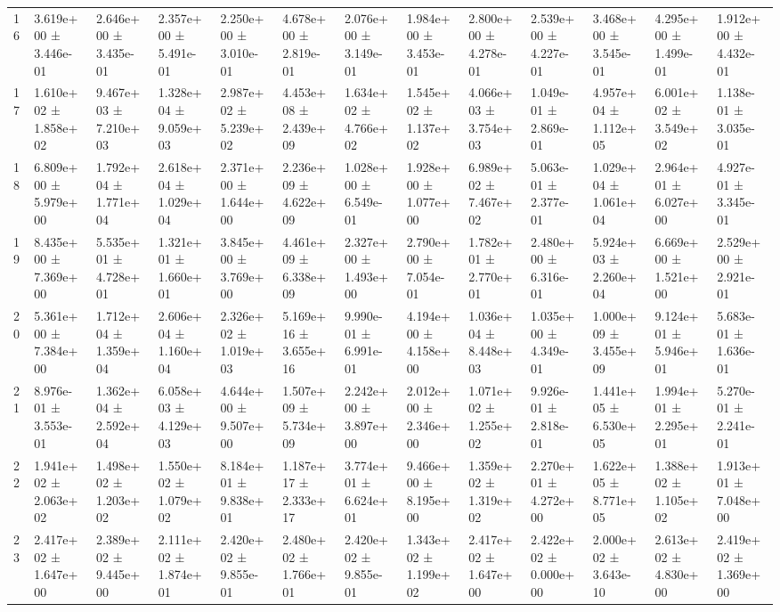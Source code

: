 \begin{table}
\begin{tabular}{lllllllllllll}
16 & 3.619e+00 ± 3.446e-01 & 2.646e+00 ± 3.435e-01 & 2.357e+00 ± 5.491e-01 & 2.250e+00 ± 3.010e-01 & 4.678e+00 ± 2.819e-01 & 2.076e+00 ± 3.149e-01 & 1.984e+00 ± 3.453e-01 & 2.800e+00 ± 4.278e-01 & 2.539e+00 ± 4.227e-01 & 3.468e+00 ± 3.545e-01 & 4.295e+00 ± 1.499e-01 & 1.912e+00 ± 4.432e-01 \\
17 & 1.610e+02 ± 1.858e+02 & 9.467e+03 ± 7.210e+03 & 1.328e+04 ± 9.059e+03 & 2.987e+02 ± 5.239e+02 & 4.453e+08 ± 2.439e+09 & 1.634e+02 ± 4.766e+02 & 1.545e+02 ± 1.137e+02 & 4.066e+03 ± 3.754e+03 & 1.049e-01 ± 2.869e-01 & 4.957e+04 ± 1.112e+05 & 6.001e+02 ± 3.549e+02 & 1.138e-01 ± 3.035e-01 \\
18 & 6.809e+00 ± 5.979e+00 & 1.792e+04 ± 1.771e+04 & 2.618e+04 ± 1.029e+04 & 2.371e+00 ± 1.644e+00 & 2.236e+09 ± 4.622e+09 & 1.028e+00 ± 6.549e-01 & 1.928e+00 ± 1.077e+00 & 6.989e+02 ± 7.467e+02 & 5.063e-01 ± 2.377e-01 & 1.029e+04 ± 1.061e+04 & 2.964e+01 ± 6.027e+00 & 4.927e-01 ± 3.345e-01 \\
19 & 8.435e+00 ± 7.369e+00 & 5.535e+01 ± 4.728e+01 & 1.321e+01 ± 1.660e+01 & 3.845e+00 ± 3.769e+00 & 4.461e+09 ± 6.338e+09 & 2.327e+00 ± 1.493e+00 & 2.790e+00 ± 7.054e-01 & 1.782e+01 ± 2.770e+01 & 2.480e+00 ± 6.316e-01 & 5.924e+03 ± 2.260e+04 & 6.669e+00 ± 1.521e+00 & 2.529e+00 ± 2.921e-01 \\
20 & 5.361e+00 ± 7.384e+00 & 1.712e+04 ± 1.359e+04 & 2.606e+04 ± 1.160e+04 & 2.326e+02 ± 1.019e+03 & 5.169e+16 ± 3.655e+16 & 9.990e-01 ± 6.991e-01 & 4.194e+00 ± 4.158e+00 & 1.036e+04 ± 8.448e+03 & 1.035e+00 ± 4.349e-01 & 1.000e+09 ± 3.455e+09 & 9.124e+01 ± 5.946e+01 & 5.683e-01 ± 1.636e-01 \\
21 & 8.976e-01 ± 3.553e-01 & 1.362e+04 ± 2.592e+04 & 6.058e+03 ± 4.129e+03 & 4.644e+00 ± 9.507e+00 & 1.507e+09 ± 5.734e+09 & 2.242e+00 ± 3.897e+00 & 2.012e+00 ± 2.346e+00 & 1.071e+02 ± 1.255e+02 & 9.926e-01 ± 2.818e-01 & 1.441e+05 ± 6.530e+05 & 1.994e+01 ± 2.295e+01 & 5.270e-01 ± 2.241e-01 \\
22 & 1.941e+02 ± 2.063e+02 & 1.498e+02 ± 1.203e+02 & 1.550e+02 ± 1.079e+02 & 8.184e+01 ± 9.838e+01 & 1.187e+17 ± 2.333e+17 & 3.774e+01 ± 6.624e+01 & 9.466e+00 ± 8.195e+00 & 1.359e+02 ± 1.319e+02 & 2.270e+01 ± 4.272e+00 & 1.622e+05 ± 8.771e+05 & 1.388e+02 ± 1.105e+02 & 1.913e+01 ± 7.048e+00 \\
23 & 2.417e+02 ± 1.647e+00 & 2.389e+02 ± 9.445e+00 & 2.111e+02 ± 1.874e+01 & 2.420e+02 ± 9.855e-01 & 2.480e+02 ± 1.766e+01 & 2.420e+02 ± 9.855e-01 & 1.343e+02 ± 1.199e+02 & 2.417e+02 ± 1.647e+00 & 2.422e+02 ± 0.000e+00 & 2.000e+02 ± 3.643e-10 & 2.613e+02 ± 4.830e+00 & 2.419e+02 ± 1.369e+00 \\

\end{tabular}
\end{table}
